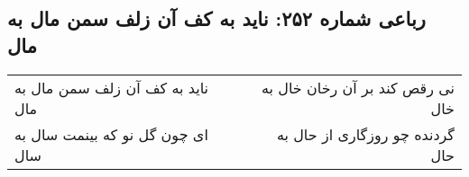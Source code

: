 \begin{center}
\section*{رباعی شماره ۲۵۲: ناید به کف آن زلف سمن مال به مال}
\label{sec:sh252}
\begin{longtable}{l p{0.5cm} r}
ناید به کف آن زلف سمن مال به مال
&&
نی رقص کند بر آن رخان خال به خال
\\
ای چون گل نو که بینمت سال به سال
&&
گردنده چو روزگاری از حال به حال
\\
\end{longtable}
\end{center}
